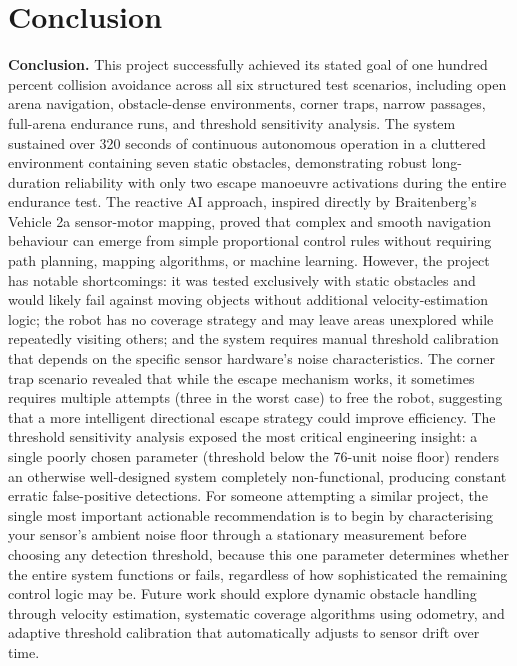 \documentclass[12pt, a4paper]{article}
\begin{document}
\section{Conclusion}

\textbf{Conclusion.} This project successfully achieved its stated goal of one hundred percent collision avoidance across all six structured test scenarios, including open arena navigation, obstacle-dense environments, corner traps, narrow passages, full-arena endurance runs, and threshold sensitivity analysis. The system sustained over 320 seconds of continuous autonomous operation in a cluttered environment containing seven static obstacles, demonstrating robust long-duration reliability with only two escape manoeuvre activations during the entire endurance test. The reactive AI approach, inspired directly by Braitenberg's Vehicle 2a sensor-motor mapping, proved that complex and smooth navigation behaviour can emerge from simple proportional control rules without requiring path planning, mapping algorithms, or machine learning. However, the project has notable shortcomings: it was tested exclusively with static obstacles and would likely fail against moving objects without additional velocity-estimation logic; the robot has no coverage strategy and may leave areas unexplored while repeatedly visiting others; and the system requires manual threshold calibration that depends on the specific sensor hardware's noise characteristics. The corner trap scenario revealed that while the escape mechanism works, it sometimes requires multiple attempts (three in the worst case) to free the robot, suggesting that a more intelligent directional escape strategy could improve efficiency. The threshold sensitivity analysis exposed the most critical engineering insight: a single poorly chosen parameter (threshold below the 76-unit noise floor) renders an otherwise well-designed system completely non-functional, producing constant erratic false-positive detections. For someone attempting a similar project, the single most important actionable recommendation is to begin by characterising your sensor's ambient noise floor through a stationary measurement before choosing any detection threshold, because this one parameter determines whether the entire system functions or fails, regardless of how sophisticated the remaining control logic may be. Future work should explore dynamic obstacle handling through velocity estimation, systematic coverage algorithms using odometry, and adaptive threshold calibration that automatically adjusts to sensor drift over time.
\end{document}
